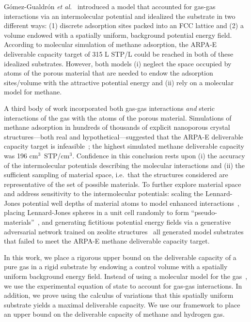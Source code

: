 G\'omez-Gualdr\'on \emph{et al.}~\cite{gomez2017impact} introduced a model that
accounted for gas-gas interactions via an intermolecular potential and
idealized the substrate in two different ways: (1) discrete adsorption sites
packed into an FCC lattice and (2) a volume endowed with a spatially uniform,
background potential energy field. According to molecular simulation of methane
adsorption, the ARPA-E deliverable capacity target of 315 L STP/L could be
reached in both of these idealized substrates. However, both models (i)
neglect the space occupied by atoms of the porous material that are needed to
endow the adsorption sites/volume with the attractive potential energy and (ii)
rely on a molecular model for methane.

A third body of work incorporated both gas-gas interactions \emph{and} steric
interactions of the gas with the atoms of the porous material. Simulations of
methane adsorption in hundreds of thousands of explicit nanoporous crystal
structures---both real and hypothetical---suggested that the ARPA-E deliverable
capacity target is infeasible~\cite{simon2015materials}; the highest simulated
methane deliverable capacity was 196 cm$^3$~STP/cm$^3$. Confidence in this
conclusion rests upon (i) the accuracy of the intermolecular potentials
describing the molecular interactions and (ii) the sufficient sampling of
material space, i.e.\ that the structures considered are representative of the
set of possible materials. To further explore material space and address
sensitivity to the intermolecular potentials: scaling the Lennard-Jones
potential well depths of material atoms to model enhanced
interactions~\cite{gomez2014exploring}, placing Lennard-Jones spheres in a unit
cell randomly to form ``pseudo-materials''~\cite{kaija2018high}, and generating
fictitious potential energy fields via a generative adversarial network trained
on zeolite structures~\cite{lee2019predicting} all generated model substrates
that failed to meet the ARPA-E methane deliverable capacity target.


In this work, we place a rigorous upper bound on the deliverable capacity of a
pure gas in a rigid substrate by endowing a control volume with a spatially
uniform background energy field. Instead of using a molecular model for the
gas~\cite{gomez2017impact}, we use the experimental equation of state to
account for gas-gas interactions. In addition, we prove using the calculus of
variations that this spatially uniform substrate yields a maximal deliverable
capacity. We use our framework to place an upper bound on the deliverable
capacity of methane and hydrogen gas.

